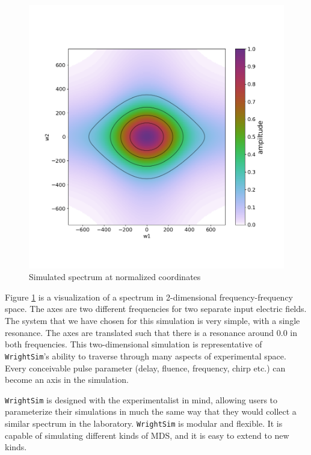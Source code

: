 \begin{figure}
\centering
	\includegraphics[width=6in]{simulation/images/example_spectrum.png}
\caption{Simulated spectrum at normalized coordinates
\label{sim:fig:examplespectrum}}
\end{figure}

Figure \ref{sim:fig:examplespectrum} is a visualization of a spectrum in
2-dimensional frequency-frequency space. The axes are two different
frequencies for two separate input electric fields. The system that we
have chosen for this simulation is very simple, with a single resonance.
The axes are translated such that there is a resonance around \(0.0\) in
both frequencies. This two-dimensional simulation is representative of
\texttt{WrightSim}'s ability to traverse through many aspects of
experimental space. Every conceivable pulse parameter (delay, fluence,
frequency, chirp etc.) can become an axis in the simulation.

\texttt{WrightSim} is designed with the experimentalist in mind,
allowing users to parameterize their simulations in much the same way
that they would collect a similar spectrum in the laboratory.
\texttt{WrightSim} is modular and flexible. It is capable of simulating
different kinds of MDS, and it is easy to extend to new kinds.

